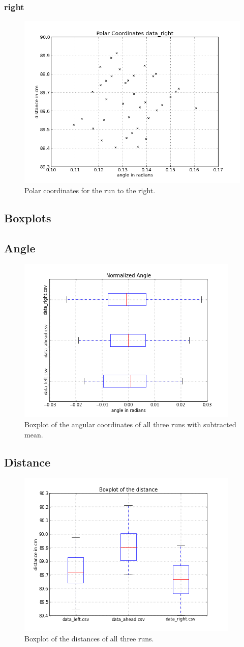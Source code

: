 \documentclass{scrartcl}
\begin{document}
\subsubsection{right}
\begin{figure}[H]
  \centering
  \includegraphics[width=0.5\linewidth]{img/data_right_pc.png}
  \caption{Polar coordinates for the run to the right.}
\end{figure}


\subsection{Boxplots}

\subsection{Angle}

\begin{figure}[H]
  \centering
  \includegraphics[width=0.5\linewidth]{img/BoxplotAngleNorm.png}
  \caption{Boxplot of the angular coordinates of all three runs with subtracted mean.}
\end{figure}

\subsection{Distance}
\begin{figure}[H]
  \centering
  \includegraphics[width=0.5\linewidth]{img/BoxplotDistance.png}
  \caption{Boxplot of the distances of all three runs.}
\end{figure}
\end{document}
